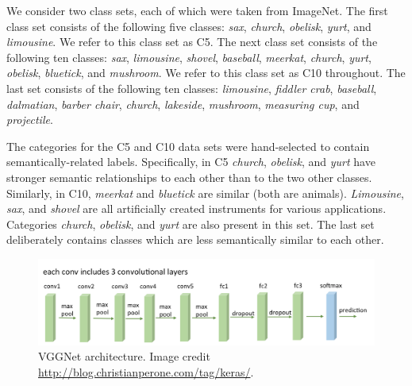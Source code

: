 
We consider two class sets, each of which were taken from ImageNet. The first
class set consists of the following five classes:
\emph{sax},
\emph{church},
\emph{obelisk},
\emph{yurt}, and
\emph{limousine}.
We refer to this class set as C5.
The next class set consists of the following ten classes:
\emph{sax},
\emph{limousine},
\emph{shovel},
\emph{baseball},
\emph{meerkat},
\emph{church},
\emph{yurt},
\emph{obelisk},
\emph{bluetick}, and
\emph{mushroom}.
We refer to this class set as C10 throughout.
The last set consists of the following ten classes:
\emph{limousine},
\emph{fiddler crab},
\emph{baseball},
\emph{dalmatian},
\emph{barber chair},
\emph{church},
\emph{lakeside},
\emph{mushroom},
\emph{measuring cup}, and
\emph{projectile}.

The categories for the C5 and C10 data sets were hand-selected to contain
semantically-related labels. Specifically, in C5
\emph{church}, \emph{obelisk}, and \emph{yurt}
have stronger semantic relationships to each other than to the two other
classes.
Similarly, in C10,
\emph{meerkat} and \emph{bluetick} are similar (both are animals).
\emph{Limousine}, \emph{sax}, and \emph{shovel} are all artificially created
instruments for various applications.
Categories \emph{church}, \emph{obelisk}, and \emph{yurt} are also present in
this set.
The last set deliberately contains classes which are less semantically similar
to each other.


\begin{figure}[t]
  \centering
  \includegraphics[width=1.0\textwidth]{figs/vgg16arch.png}
  \caption{
      VGGNet architecture. Image credit
      \url{http://blog.christianperone.com/tag/keras/}.
  }
  \label{fig:vgg16arch}
\end{figure}

